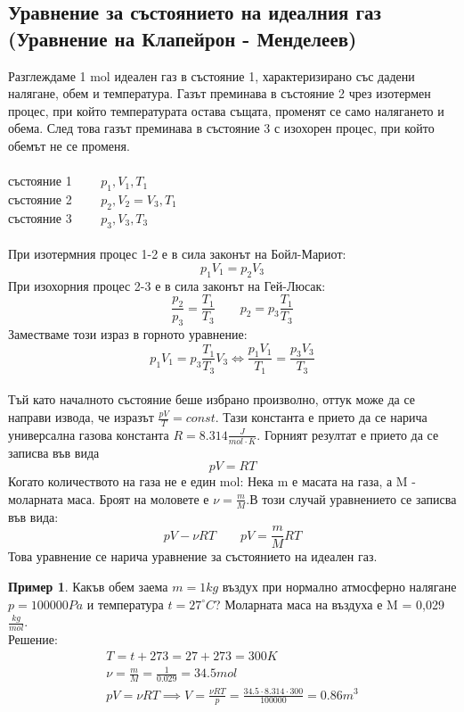 \documentclass[fleqn, 12pt]{article}
\theoremstyle{definition}
\newtheorem{example}{Пример}[subsection]
\begin{document}
\subsection{Уравнение за състоянието на идеалния газ (Уравнение на Клапейрон - Менделеев)}
Разглеждаме 1 mol идеален газ в състояние 1, характеризирано със дадени
налягане, обем и температура. Газът преминава в състояние 2 чрез изотермен процес,
при който температурата остава същата, променят се само налягането и обема. След
това газът преминава в състояние 3 с изохорен процес, при който обемът не се
променя. \\ \\
състояние 1 $ \qquad p_1, V_1, T_1$ \\
състояние 2 $ \qquad p_2, V_2 = V_3, T_1$ \\
състояние 3 $ \qquad p_3, V_3, T_3$ \\
\\
При изотермния процес 1-2 е в сила законът на Бойл-Мариот:
$$p_1 V_1 = p_2V_3$$ 
При изохорния процес 2-3 е в сила законът на Гей-Люсак:
$$\frac{p_2}{p_3} = \frac{T_1}{T_3} \qquad p_2 = p_3 \frac{T_1}{T_3}$$
Заместваме този израз в горното уравнение:
$$p_1 V_1 =  p_3 \frac{T_1}{T_3} V_3 \Leftrightarrow  \frac{p_1V_1}{T_1} =  \frac{p_3V_3}{T_3} $$ \\
Тъй като началното състояние беше избрано произволно, оттук може
да се направи извода, че изразът $\frac{pV}{T} = const$. Тази константа е прието да се нарича
универсална газова константа $R = 8.314 \frac{J}{mol \cdot K}$. Горният резултат е прието да се записва във вида 
$$pV = RT$$
Когато количеството на газа не е един mol: Нека m е масата на газа, а M - моларната маса. Броят на моловете е $\nu = \frac{m}{M}$.В този случай уравнението се записва във вида:
$$pV - \nu RT \qquad pV = \frac{m}{M}RT$$
Това уравнение се нарича уравнение за състоянието на идеален газ.

\begin{example}
Какъв обем заема $m= 1 kg$ въздух при нормално атмосферно налягане $p = 100000 Pa$ и температура
$t = 27^\circ C$? Моларната маса на въздуха е M = 0,029 $\frac{kg}{mol}$.\\
Решение: \\
\begin{gather*}
T = t + 273 = 27 + 273 = 300K \\
\nu = \frac{m}{M} = \frac{1}{0.029} = 34.5 mol \\
pV = \nu RT \implies V = \frac{\nu RT}{p} = \frac{34.5 \cdot 8.314 \cdot 300 }{100 000} = 0.86 m^3
\end{gather*}
\end{example}
\end{document}
